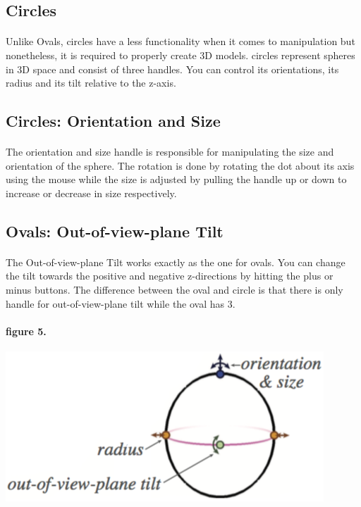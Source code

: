 \documentclass{report}
\begin{document}
\subsection*{Circles}

\paragraph{} Unlike Ovals, circles have a less functionality when it comes to manipulation but nonetheless, it is required to properly create 3D models. circles represent spheres in 3D space and consist of three handles. You can control its orientations, its radius and its tilt relative to the z-axis.
\paragraph{} 
\subsection*{Circles: Orientation and Size}

\paragraph{} The orientation and size handle is responsible for manipulating the size and orientation of the sphere. The rotation is done by rotating the dot about its axis using the mouse while the size is adjusted by pulling the handle up or down to increase or decrease in size respectively.

\subsection*{Ovals: Out-of-view-plane Tilt}

\paragraph{} The Out-of-view-plane Tilt works exactly as the one for ovals. You can change the tilt towards the positive and negative z-directions by hitting the plus or minus buttons. The difference between the oval and circle is that there is only handle for out-of-view-plane tilt while the oval has 3.

\paragraph{figure 5.}
\begin{center}
\includegraphics[width=\textwidth/2]{sphere_handles.png}
\end{center}
\end{document}
